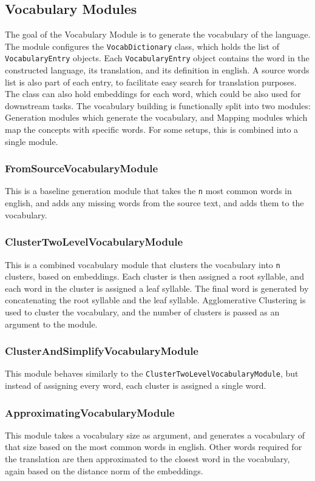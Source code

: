 \subsection{Vocabulary Modules}
The goal of the Vocabulary Module is to generate the vocabulary of the language. The module configures the \texttt{VocabDictionary} class, which
holds the list of \texttt{VocabularyEntry} objects. Each \texttt{VocabularyEntry} object contains the word in the constructed language, its translation,
and its definition in english. 
A source words list is also part of each entry, to facilitate easy search for translation purposes. The class can also hold embeddings for each word, which could be also used for downstream tasks.
The vocabulary building is functionally split into two modules: Generation modules which generate the vocabulary, and Mapping modules which map the concepts with specific words. For some setups, this
is combined into a single module.

\subsubsection{FromSourceVocabularyModule}
This is a baseline generation module that takes the \texttt{n} most common words in english, and adds any missing words from the source text, and adds them to the vocabulary.

\subsubsection{ClusterTwoLevelVocabularyModule}
This is a combined vocabulary module that clusters the vocabulary into \texttt{n} clusters, based on embeddings. Each cluster is then assigned a 
root syllable, and each word in the cluster is assigned a leaf syllable. The final word is generated by concatenating the root syllable and the leaf syllable.
Agglomerative Clustering is used to cluster the vocabulary, and the number of clusters is passed as an argument to the module.

\subsubsection{ClusterAndSimplifyVocabularyModule}
This module behaves similarly to the \texttt{ClusterTwoLevelVocabularyModule}, but instead of assigning every word, each cluster is assigned a single word. 

\subsubsection{ApproximatingVocabularyModule}
This module takes a vocabulary size as argument, and generates a vocabulary of that size based on the most common words in english. Other words required for the translation
are then approximated to the closest word in the vocabulary, again based on the distance norm of the embeddings.

